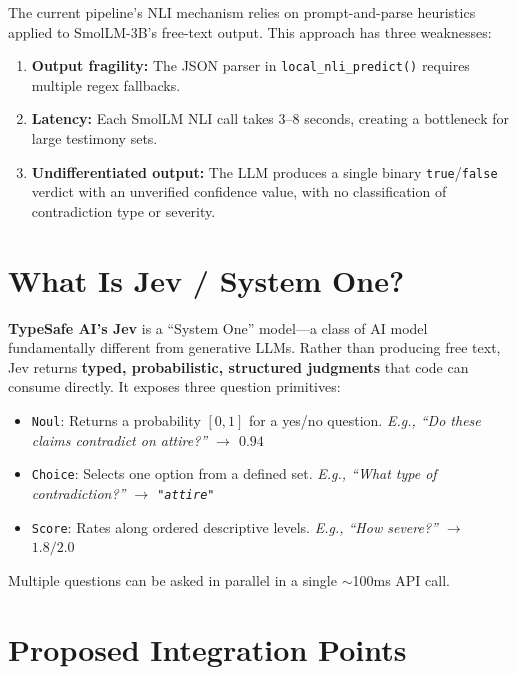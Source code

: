 \documentclass[12pt,a4paper]{report}
\begin{document}
The current pipeline's NLI mechanism relies on prompt-and-parse heuristics applied to SmolLM-3B's free-text output. This approach has three weaknesses:
\begin{enumerate}[leftmargin=2cm]
    \item \textbf{Output fragility:} The JSON parser in \texttt{local\_nli\_predict()} requires multiple regex fallbacks.
    \item \textbf{Latency:} Each SmolLM NLI call takes 3--8 seconds, creating a bottleneck for large testimony sets.
    \item \textbf{Undifferentiated output:} The LLM produces a single binary \texttt{true}/\texttt{false} verdict with an unverified confidence value, with no classification of contradiction type or severity.
\end{enumerate}

\section{What Is Jev / System One?}

\textbf{TypeSafe AI's Jev} is a ``System One'' model---a class of AI model fundamentally different from generative LLMs. Rather than producing free text, Jev returns \textbf{typed, probabilistic, structured judgments} that code can consume directly. It exposes three question primitives:

\begin{itemize}[leftmargin=2cm]
    \item \texttt{Noul}: Returns a probability $[0,1]$ for a yes/no question. \textit{E.g., ``Do these claims contradict on attire?'' $\rightarrow$ $0.94$}
    \item \texttt{Choice}: Selects one option from a defined set. \textit{E.g., ``What type of contradiction?'' $\rightarrow$ \texttt{"attire"}}
    \item \texttt{Score}: Rates along ordered descriptive levels. \textit{E.g., ``How severe?'' $\rightarrow$ $1.8 / 2.0$}
\end{itemize}

Multiple questions can be asked in parallel in a single $\sim$100ms API call.

\section{Proposed Integration Points}
\end{document}
